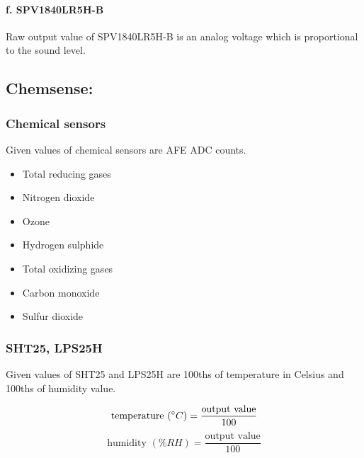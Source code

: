 % 


\paragraph{f. SPV1840LR5H-B}

Raw output value of SPV1840LR5H-B is an analog voltage which is proportional to the sound level.


\bigbreak
\subsection{Chemsense:}
\subsubsection{ Chemical sensors}

Given values of chemical sensors are AFE ADC counts.

\begin{itemize}
  \item Total reducing gases
  \item Nitrogen dioxide
  \item Ozone
  \item Hydrogen sulphide
  \item Total oxidizing gases
  \item Carbon monoxide
  \item Sulfur dioxide
\end{itemize}


\subsubsection{ SHT25, LPS25H}

Given values of SHT25 and LPS25H are 100ths of temperature in Celsius and 100ths of humidity value.

{\centering
 \[ \text{temperature }(\degree C) = \frac{\text{output value}}{100} \]
 \[ \text{humidity }(\% RH) = \frac{\text{output value}}{100} \]
 \par
 }

